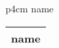 \documentclass{article}
\begin{document}
\begin{tabular}[t]{p{4cm}}\hline
name \\
\hline
\end{tabular}


\begin{tabularx}{\linewidth}[t]{X}\hline
name \\
\hline
\end{tabularx}
\end{document}
